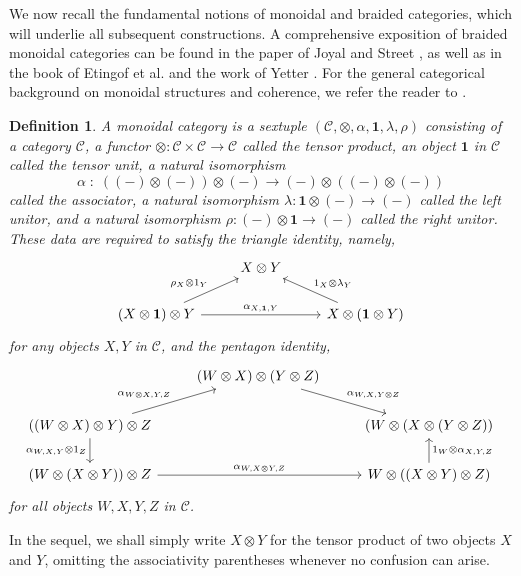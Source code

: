 \documentclass{amsart}
\newtheorem{definition}{Definition}[section]
\begin{document}
We now recall the fundamental notions of monoidal and braided categories, which will underlie all subsequent constructions. A comprehensive exposition of braided monoidal categories can be found in the paper of Joyal and Street \cite{BT}, as well as in the book of Etingof et al. \cite{TC} and the work of Yetter \cite{QG}. For the general categorical background on monoidal structures and coherence, we refer the reader to \cite{borceux1994handbook}.

\begin{definition}\label{def:monoidal}
A monoidal category is a sextuple $(\mathcal{C},\otimes,\alpha,\mathbf{1},\lambda,\rho)$ consisting of a category $\mathcal{C}$, a functor $\otimes\colon \mathcal{C}\times \mathcal{C}\longrightarrow \mathcal{C}$ called the tensor product, an object $\mathbf{1}$ in $\mathcal{C}$ called the tensor unit, a natural isomorphism 
\[
\alpha\;\colon\;((-)\otimes(-))\otimes(-)\longrightarrow (-)\otimes ((-)\otimes(-))
\]
called the associator, a natural isomorphism $\lambda\colon \mathbf{1}\otimes(-)\longrightarrow (-)$ called the left unitor, and a natural isomorphism $\rho\colon (-)\otimes\mathbf{1}\longrightarrow (-)$ called the right unitor. These data are required to satisfy the triangle identity, namely,
\[
\begin{tikzcd}
 & X\otimes Y\\
(X\otimes\mathbf{1})\otimes Y  \arrow{ur}{\rho_X\otimes 1_Y} \arrow{rr}{\alpha_{X,\mathbf{1},Y}} &&X\otimes(\mathbf{1}\otimes Y)\arrow[swap]{ul}{1_X\otimes\lambda_Y}
\end{tikzcd}
\label{eq:triangle}
\]
for any objects $X,Y$ in $\mathcal{C}$, and the pentagon identity,
\[
\begin{tikzcd}
 & (W\otimes X)\otimes (Y\otimes Z)\arrow{dr}{\alpha_{W,X,Y\otimes Z}}\\
((W\otimes X)\otimes Y)\otimes Z  \arrow{ur}{\alpha_{W\otimes X,Y,Z}} \arrow[swap]{d}{\alpha_{W,X,Y}\otimes 1_Z} && (W\otimes(X\otimes(Y\otimes Z))\\
(W\otimes(X\otimes Y))\otimes Z \arrow{rr}{\alpha_{W,X\otimes Y,Z}}&& W\otimes((X\otimes Y)\otimes Z)\arrow[swap]{u}{1_W\otimes \alpha_{X,Y,Z}}
\end{tikzcd}
\label{eq:pentagon}
\]
for all objects $W,X,Y,Z$ in $\mathcal{C}$.
\end{definition}

In the sequel, we shall simply write $X\otimes Y$ for the tensor product of two objects $X$ and $Y$, omitting the associativity parentheses whenever no confusion can arise.
\end{document}
